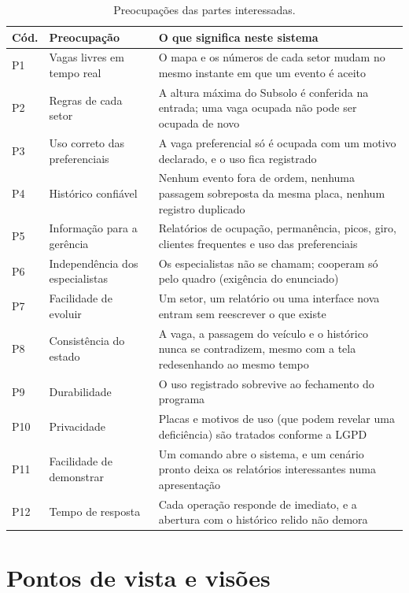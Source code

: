 \begin{table}[H]
\centering
\caption{Preocupações das partes interessadas.}
\label{tab:preocupacoes}
\begin{tabular}{L{1.1cm}L{4.2cm}L{9.2cm}}
\toprule
\textbf{Cód.} & \textbf{Preocupação} & \textbf{O que significa neste sistema} \\
\midrule
P1 & Vagas livres em tempo real & O mapa e os números de cada setor mudam no mesmo instante em que um evento é aceito \\
P2 & Regras de cada setor & A altura máxima do Subsolo é conferida na entrada; uma vaga ocupada não pode ser ocupada de novo \\
P3 & Uso correto das preferenciais & A vaga preferencial só é ocupada com um motivo declarado, e o uso fica registrado \\
P4 & Histórico confiável & Nenhum evento fora de ordem, nenhuma passagem sobreposta da mesma placa, nenhum registro duplicado \\
P5 & Informação para a gerência & Relatórios de ocupação, permanência, picos, giro, clientes frequentes e uso das preferenciais \\
P6 & Independência dos especialistas & Os especialistas não se chamam; cooperam só pelo quadro (exigência do enunciado) \\
P7 & Facilidade de evoluir & Um setor, um relatório ou uma interface nova entram sem reescrever o que existe \\
P8 & Consistência do estado & A vaga, a passagem do veículo e o histórico nunca se contradizem, mesmo com a tela redesenhando ao mesmo tempo \\
P9 & Durabilidade & O uso registrado sobrevive ao fechamento do programa \\
P10 & Privacidade & Placas e motivos de uso (que podem revelar uma deficiência) são tratados conforme a LGPD \\
P11 & Facilidade de demonstrar & Um comando abre o sistema, e um cenário pronto deixa os relatórios interessantes numa apresentação \\
P12 & Tempo de resposta & Cada operação responde de imediato, e a abertura com o histórico relido não demora \\
\bottomrule
\end{tabular}
\end{table}

\section{Pontos de vista e visões}
\label{sec:pontos}

